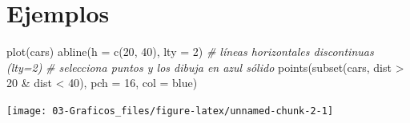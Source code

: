 \documentclass[
]{book}
\newenvironment{Shaded}{\begin{snugshade}}{\end{snugshade}}
\newcommand{\AttributeTok}[1]{\textcolor[rgb]{0.77,0.63,0.00}{#1}}
\newcommand{\CommentTok}[1]{\textcolor[rgb]{0.56,0.35,0.01}{\textit{#1}}}
\newcommand{\DecValTok}[1]{\textcolor[rgb]{0.00,0.00,0.81}{#1}}
\newcommand{\FunctionTok}[1]{\textcolor[rgb]{0.00,0.00,0.00}{#1}}
\newcommand{\NormalTok}[1]{#1}
\newcommand{\SpecialCharTok}[1]{\textcolor[rgb]{0.00,0.00,0.00}{#1}}
\newcommand{\StringTok}[1]{\textcolor[rgb]{0.31,0.60,0.02}{#1}}
\theoremstyle{break}
\begin{document}
\hypertarget{ejemplos-1}{%
\section{Ejemplos}\label{ejemplos-1}}

\begin{Shaded}
\begin{Highlighting}[]
\FunctionTok{plot}\NormalTok{(cars)}
\FunctionTok{abline}\NormalTok{(}\AttributeTok{h =} \FunctionTok{c}\NormalTok{(}\DecValTok{20}\NormalTok{, }\DecValTok{40}\NormalTok{), }\AttributeTok{lty =} \DecValTok{2}\NormalTok{) }\CommentTok{\# líneas horizontales discontinuas (lty=2)}
\CommentTok{\# selecciona puntos y los dibuja en azul sólido}
\FunctionTok{points}\NormalTok{(}\FunctionTok{subset}\NormalTok{(cars, dist }\SpecialCharTok{\textgreater{}} \DecValTok{20} \SpecialCharTok{\&}\NormalTok{ dist }\SpecialCharTok{\textless{}} \DecValTok{40}\NormalTok{), }\AttributeTok{pch =} \DecValTok{16}\NormalTok{, }\AttributeTok{col =} \StringTok{\textquotesingle{}blue\textquotesingle{}}\NormalTok{) }
\end{Highlighting}
\end{Shaded}

\begin{center}\texttt{[image: 03-Graficos\_files/figure-latex/unnamed-chunk-2-1]} \end{center}
\end{document}
